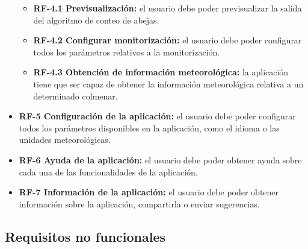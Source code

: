 \begin{itemize}
  \begin{itemize}
  \tightlist
  \item
    \textbf{RF-4.1 Previsualización:} el usuario debe poder
    previsualizar la salida del algoritmo de conteo de abejas.
  \item
    \textbf{RF-4.2 Configurar monitorización:} el usuario debe poder
    configurar todos los parámetros relativos a la monitorización.
  \item
    \textbf{RF-4.3 Obtención de información meteorológica:} la
    aplicación tiene que ser capaz de obtener la información
    meteorológica relativa a un determinado colmenar.
  \end{itemize}
\item
  \textbf{RF-5 Configuración de la aplicación:} el usuario debe poder
  configurar todos los parámetros disponibles en la aplicación, como el
  idioma o las unidades meteorológicas.
\item
  \textbf{RF-6 Ayuda de la aplicación:} el usuario debe poder obtener
  ayuda sobre cada una de las funcionalidades de la aplicación.
\item
  \textbf{RF-7 Información de la aplicación:} el usuario debe poder
  obtener información sobre la aplicación, compartirla o enviar
  sugerencias.
\end{itemize}

\subsection{Requisitos no funcionales}\label{requisitos-no-funcionales}

